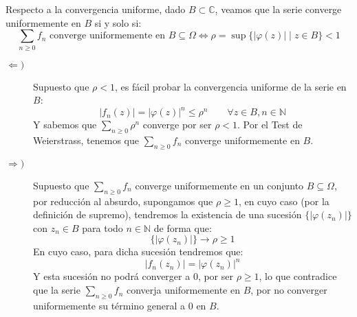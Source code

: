 \documentclass[12pt]{article}
\begin{document}
\begin{ejercicio}[3.5 puntos]
        Respecto a la convergencia uniforme, dado $B\subset \mathbb{C}$, veamos que la serie converge uniformemente en $B$ si y solo si:
        \begin{equation*}
            \sum_{n\geq 0} f_n \text{\ converge uniformemente en\ } B \subseteq \Omega \Longleftrightarrow \rho = \sup\{|\varphi(z)| \mid z\in B\} < 1
        \end{equation*}
        \begin{description}
            \item [$\Longleftarrow)$] Supuesto que $\rho < 1$, es fácil probar la convergencia uniforme de la serie en $B$:
                \begin{equation*}
                    |f_n(z)| = {|\varphi(z)|}^{n} \leq \rho^n \qquad \forall z\in B, n\in \mathbb{N}
                \end{equation*}
                Y sabemos que $\sum\limits_{n\geq 0}\rho^n$ converge por ser $\rho < 1$. Por el Test de Weierstrass, tenemos que $\sum\limits_{n\geq 0}f_n$ converge uniformemente en $B$.
            \item [$\Longrightarrow)$] Supuesto que $\sum\limits_{n\geq 0}f_n$ converge uniformemente en un conjunto $B\subseteq \Omega$, por reducción al absurdo, supongamos que $\rho \geq 1$, en cuyo caso (por la definición de supremo), tendremos la existencia de una sucesión $\{|\varphi(z_n)|\}$ con $z_n \in B$ para todo $n\in \mathbb{N}$ de forma que:
                \begin{equation*}
                    \{|\varphi(z_n)|\} \to \rho \geq 1
                \end{equation*}
                En cuyo caso, para dicha sucesión tendremos que:
                \begin{equation*}
                    |f_n(z_n)| = {|\varphi(z_n)|}^{n}
                \end{equation*}
                Y esta sucesión no podrá converger a 0, por ser $\rho \geq 1$, lo que contradice que la serie $\sum\limits_{n\geq 0} f_n$ converja uniformemente en $B$, por no converger uniformemente su término general a 0 en $B$.
        \end{description}
    \end{ejercicio}
\end{document}
